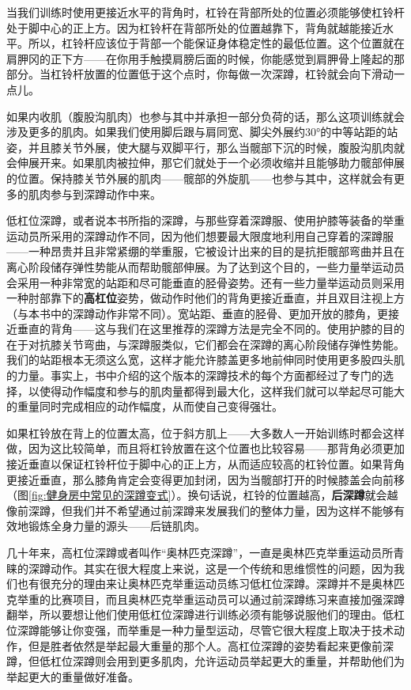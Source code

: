 当我们训练时使用更接近水平的背角时，杠铃在背部所处的位置必须能够使杠铃杆处于脚中心的正上方。因为杠铃杆在背部所处的位置越靠下，背角就越能接近水平。所以，杠铃杆应该位于背部一个能保证身体稳定性的最低位置。这个位置就在肩胛冈的正下方——在你用手触摸肩膀后面的时候，你能感觉到肩胛骨上隆起的那部分。当杠铃杆放置的位置低于这个点时，你每做一次深蹲，杠铃就会向下滑动一点儿。

如果内收肌（腹股沟肌肉）也参与其中并承担一部分负荷的话，那么这项训练就会涉及更多的肌肉。如果我们使用脚后跟与肩同宽、脚尖外展约30°的中等站距的站姿，并且膝关节外展，使大腿与双脚平行，那么当髋部下沉的时候，腹股沟肌肉就会伸展开来。如果肌肉被拉伸，那它们就处于一个必须收缩并且能够助力髋部伸展的位置。保持膝关节外展的肌肉——髋部的外旋肌——也参与其中，这样就会有更多的肌肉参与到深蹲动作中来。

低杠位深蹲，或者说本书所指的深蹲，与那些穿着深蹲服、使用护膝等装备的举重运动员所采用的深蹲动作不同，因为他们想要最大限度地利用自己穿着的深蹲服——一种昂贵并且非常紧绷的举重服，它被设计出来的目的是抗拒髋部弯曲并且在离心阶段储存弹性势能从而帮助髋部伸展。为了达到这个目的，一些力量举运动员会采用一种非常宽的站距和尽可能垂直的胫骨姿势。还有一些力量举运动员则采用一种肘部靠下的\textbf{高杠位}姿势，做动作时他们的背角更接近垂直，并且双目注视上方（与本书中的深蹲动作非常不同）。宽站距、垂直的胫骨、更加开放的膝角，更接近垂直的背角——这与我们在这里推荐的深蹲方法是完全不同的。使用护膝的目的在于对抗膝关节弯曲，与深蹲服类似，它们都会在深蹲的离心阶段储存弹性势能。我们的站距根本无须这么宽，这样才能允许膝盖更多地前伸同时使用更多股四头肌的力量。事实上，书中介绍的这个版本的深蹲技术的每个方面都经过了专门的选择，以使得动作幅度和参与的肌肉量都得到最大化，这样我们就可以举起尽可能大的重量同时完成相应的动作幅度，从而使自己变得强壮。

如果杠铃放在背上的位置太高，位于斜方肌上——大多数人一开始训练时都会这样做，因为这比较简单，而且将杠铃放置在这个位置也比较容易——那背角必须更加接近垂直以保证杠铃杆位于脚中心的正上方，从而适应较高的杠铃位置。如果背角更接近垂直，那么膝角肯定会变得更加封闭，因为当髋部打开的时候膝盖会向前移（图\ref{fig:健身房中常见的深蹲变式}）。换句话说，杠铃的位置越高，\textbf{后深蹲}就会越像前深蹲，但我们并不希望通过前深蹲来发展我们的整体力量，因为这样不能够有效地锻炼全身力量的源头——后链肌肉。

几十年来，高杠位深蹲或者叫作“奥林匹克深蹲”，一直是奥林匹克举重运动员所青睐的深蹲动作。其实在很大程度上来说，这是一个传统和思维惯性的问题，因为我们也有很充分的理由来让奥林匹克举重运动员练习低杠位深蹲。深蹲并不是奥林匹克举重的比赛项目，而且奥林匹克举重运动员可以通过前深蹲练习来直接加强深蹲翻举，所以要想让他们使用低杠位深蹲进行训练必须有能够说服他们的理由。低杠位深蹲能够让你变强，而举重是一种力量型运动，尽管它很大程度上取决于技术动作，但是胜者依然是举起最大重量的那个人。高杠位深蹲的姿势看起来更像前深蹲，但低杠位深蹲则会用到更多肌肉，允许运动员举起更大的重量，并帮助他们为举起更大的重量做好准备。

